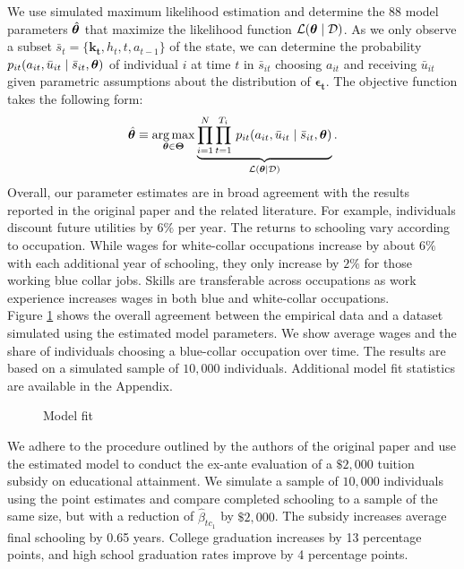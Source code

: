 \noindent We use  simulated maximum likelihood \citep{Fisher.1922,Manski.1977} estimation and determine the $88$ model parameters $\hat{\bm{\theta}}$ that maximize the likelihood function $\mathcal{L}(\bm{\theta}\mid\mathcal{D})$. As we only observe a subset $\bar{s}_t = \{\bm{k_t}, h_t, t, a_{t -1}\}$ of the state, we can determine the probability $p_{it}(a_{it}, \bar{u}_{it} \mid \bar{s}_{it}, \bm{\theta})$ of individual $i$ at time $t$ in $\bar{s}_{it}$ choosing $a_{it}$ and receiving $\bar{u}_{it}$ given parametric assumptions about the distribution of $\bm{\epsilon_t}$. The objective function takes the following form:
%
\begin{align*}
  \hat{\bm{\theta}} \equiv \operatorname*{arg\,max}_{\bm{\theta} \in \bm{\Theta}}  \underbrace{\prod^N_{i= 1} \prod^{T_i}_{t= 1}\, p_{it}(a_{it}, \bar{u}_{it} \mid \bar{s}_{it}, \bm{\theta})}_{\mathcal{L}(\bm{\theta}\mid\mathcal{D})}.
\end{align*}
%
\noindent Overall, our parameter estimates are in broad agreement with the results reported in the original paper and the related literature. For example, individuals discount future utilities by $6\%$ per year. The returns to schooling vary according to occupation. While wages for white-collar occupations increase by about $6\%$ with each additional year of schooling, they only increase by $2\%$ for those working blue collar jobs. Skills are transferable across occupations as work experience increases wages in both blue and white-collar occupations.\\

\noindent Figure \ref{Model fit} shows the overall agreement between the empirical data and a dataset simulated using the estimated model parameters. We show average wages and the share of individuals choosing a blue-collar occupation over time. The results are based on a simulated sample of $10,000$ individuals. Additional model fit statistics are available in the Appendix.
%
\begin{figure}[h!]\centering
{}
\caption{Model fit}\label{Model fit}
\end{figure}\FloatBarrier

\noindent We adhere to the procedure outlined by the authors of the original paper and use the estimated model to conduct the ex-ante evaluation of a  $\$2,000$ tuition subsidy on educational attainment. We simulate a sample of  $10,000$ individuals using the point estimates and compare completed schooling to a sample of the same size, but with a reduction of $\hat{\beta}_{tc_1}$ by $\$2,000$. The subsidy increases average final schooling by 0.65 years. College graduation increases by 13 percentage points, and high school graduation rates improve by 4 percentage points.
